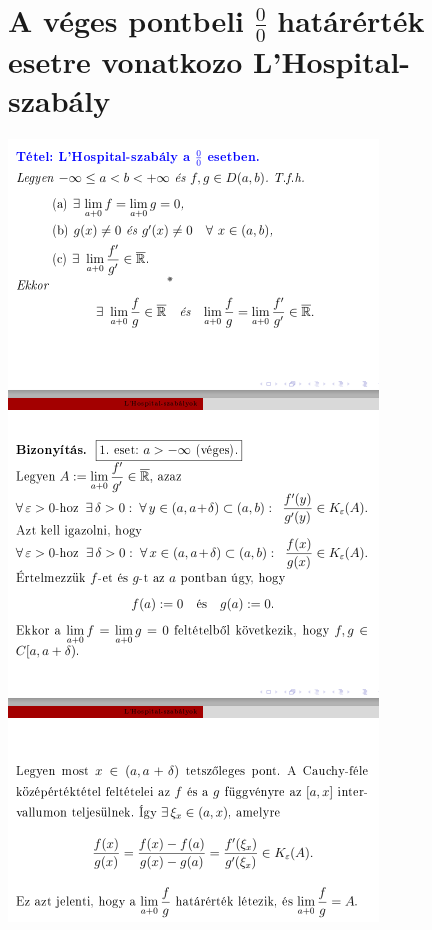 \documentclass[10pt,a4paper]{article}
\begin{document}
\section{A véges pontbeli $\frac{0}{0}$ határérték esetre vonatkozo L'Hospital-szabály}
\includegraphics[scale=1]{11.PNG}
\newpage
\end{document}

